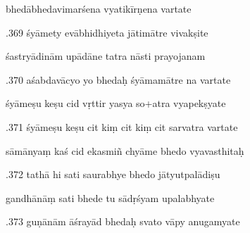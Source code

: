 \documentclass[article,12pt,a4paper]{memoir}%
\newcounter{parCount}
\begin{document}
	  
	  \pstart \leavevmode%
	bhedābhedavimarśena vyatikīrṇena vartate 
	{}
	\pend%
      

	  
	  \pstart {}.369 śyāmety evābhidhiyeta jātimātre vivakṣite 
	{}
	\pend%
      

	  
	  \pstart \leavevmode%
	śastryādinām upādāne tatra nāsti prayojanam 
	{}
	\pend%
      

	  
	  \pstart {}.370 aśabdavācyo yo bhedaḥ śyāmamātre na vartate 
	{}
	\pend%
      

	  
	  \pstart \leavevmode%
	śyāmeṣu keṣu cid vṛttir yasya so+atra vyapekṣyate 
	{}
	\pend%
      

	  
	  \pstart {}.371 śyāmeṣu keṣu cit kiṃ cit kiṃ cit sarvatra vartate 
	{}
	\pend%
      

	  
	  \pstart \leavevmode%
	sāmānyaṃ kaś cid ekasmiñ chyāme bhedo vyavasthitaḥ 
	{}
	\pend%
      

	  
	  \pstart {}.372 tathā hi sati saurabhye bhedo jātyutpalādiṣu 
	{}
	\pend%
      

	  
	  \pstart \leavevmode%
	gandhānāṃ sati bhede tu sādṛśyam upalabhyate 
	{}
	\pend%
      

	  
	  \pstart {}.373 guṇānām āśrayād bhedaḥ svato vāpy anugamyate 
	{}
	\pend%
      
\end{document}
